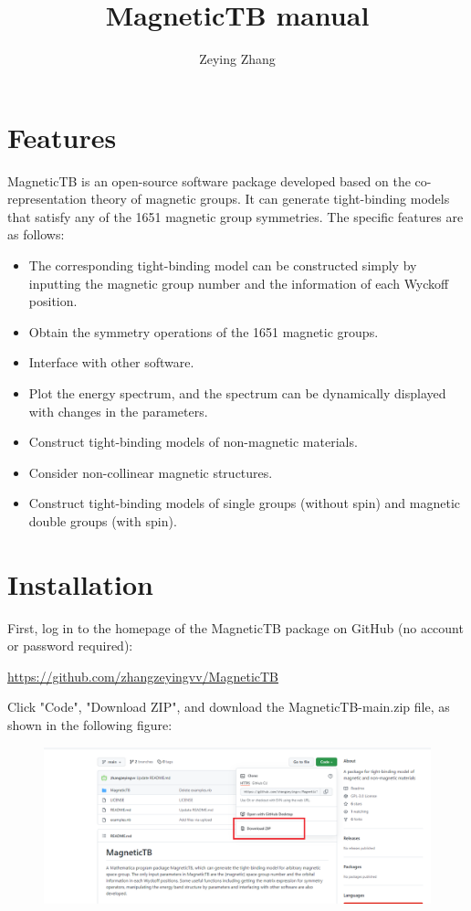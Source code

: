 \documentclass[titlepage,a4paper,12pt,AutoFakeBold]{article}
\begin{document}
\title{\textsf{MagneticTB} manual}
\author{Zeying Zhang}

\maketitle


\tableofcontents

\newpage

\section{Features}
\textsf{MagneticTB} is an open-source software package developed based on the co-representation theory of magnetic groups. It can generate tight-binding models that satisfy any of the 1651 magnetic group symmetries. The specific features are as follows:
\begin{itemize}
\item   The corresponding tight-binding model can be constructed simply by inputting the magnetic group number and the information of each Wyckoff position.
\item	Obtain the symmetry operations of the 1651 magnetic groups.
\item	Interface with other software.
\item	Plot the energy spectrum, and the spectrum can be dynamically displayed with changes in the parameters.
\item	Construct tight-binding models of non-magnetic materials.
\item	Consider non-collinear magnetic structures.
\item	Construct tight-binding models of single groups (without spin) and magnetic double groups (with spin).
\end{itemize}


\section{Installation}

First, log in to the homepage of the \textsf{MagneticTB} package on GitHub (no account or password required):
\begin{center}
\url{https://github.com/zhangzeyingvv/MagneticTB}
\end{center}
Click "Code", "Download ZIP", and download the MagneticTB-main.zip file, as shown in the following figure:
\begin{figure}[h]
\includegraphics[width=1\textwidth]{./figures/安装1}
\end{figure}
\end{document}
